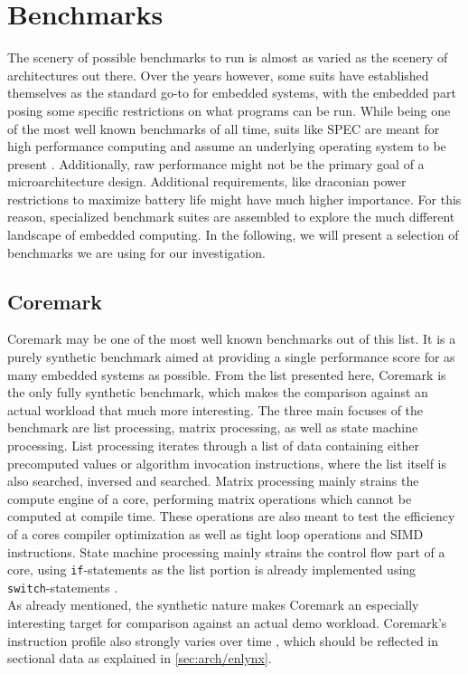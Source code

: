 \documentclass[../bachelor_paper.tex]{subfiles}
\begin{document}
\chapter{Benchmarks}
    \label{ch:bench}

The scenery of possible benchmarks to run is almost as varied as the scenery of architectures out there. Over the years however, some suits have established themselves as the standard go-to for embedded systems, with the embedded part posing some specific restrictions on what programs can be run. While being one of the most well known benchmarks of all time, suits like SPEC are meant for high performance computing and assume an underlying operating system to be present \cite{SystemRequirementsCPU}. Additionally, raw performance might not be the primary goal of a microarchitecture design. Additional requirements, like draconian power restrictions to maximize battery life might have much higher importance. For this reason, specialized benchmark suites are assembled to explore the much different landscape of embedded computing. In the following, we will present a selection of benchmarks we are using for our investigation.

\section{Coremark}
Coremark may be one of the most well known benchmarks out of this list. It is a purely synthetic benchmark aimed at providing a single performance score for as many embedded systems as possible. From the list presented here, Coremark is the only fully synthetic benchmark, which makes the comparison against an actual workload that much more interesting. The three main focuses of the benchmark are list processing, matrix processing, as well as state machine processing. List processing iterates through a list of data containing either precomputed values or algorithm invocation instructions, where the list itself is also searched, inversed and searched. Matrix processing mainly strains the compute engine of a core, performing matrix operations which cannot be computed at compile time. These operations are also meant to test the efficiency of a cores compiler optimization as well as tight loop operations and \ac{SIMD} instructions. State machine processing mainly strains the control flow part of a core, using \texttt{if}-statements as the list portion is already implemented using \texttt{switch}-statements \cite{gal-onExploringCoremarkBenchmark2012}.\\
As already mentioned, the synthetic nature makes Coremark an especially interesting target for comparison against an actual demo workload. Coremark's instruction profile also strongly varies over time \cite{gal-onExploringCoremarkBenchmark2012}, which should be reflected in sectional data as explained in \ref{sec:arch/enlynx}.
\end{document}
